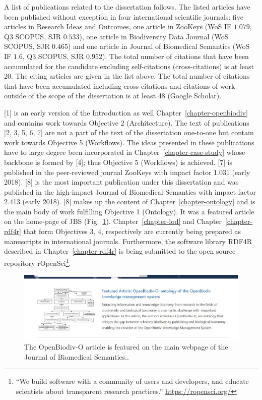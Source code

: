 A list of publications related to the dissertation follows. The listed articles have been published without exception in four international scientific journals: five articles in Research Ideas and Outcomes, one article in ZooKeys (WoS IF $1.079$, Q3 SCOPUS, SJR $0.533$), one article in Biodiversity Data Journal (WoS SCOPUS, SJR 0.465) and one article in Journal of Biomedical Semantics (WoS IF $1.6$, Q3 SCOPUS, SJR $0.952$). The total number of citations that have been accumulated for the candidate excluding self-citations (cross-citations) is at least 20. The citing articles are given in the list above. The total number of citations that have been accumulated including cross-citations and citations of work outside of the scope of the dissertation is at least 48 (Google Scholar).

[1] is an early version of the Introduction as well Chapter~\ref{chapter-openbiodiv} and contains work towards Objective 2 (Architecture). The text of publications [2, 3, 5, 6, 7] are not a part of the text of the dissertation one-to-one but contain work towards Objective 5 (Workflows). The ideas presented in these publications have to large degree been incorporated in Chapter~\ref{chapter-case-study} whose backbone is formed by [4]; thus Objective 5 (Workflows) is achieved. [7] is published in the peer-reviewed journal ZooKeys with impact factor 1.031 (early 2018). [8] is the most important publication under this dissertation and was published in the high-impact Journal of Biomedical Semantics with impact factor 2.413 (early 2018). [8] makes up the content of Chapter~\ref{chapter-ontology} and is the main body of work fulfilling Objective 1 (Ontology). It was a featured article on the home-page of JBS (Fig.~\ref{fig:jbs-featured}). Chapter~\ref{chapter-lod} and Chapter~\ref{chapter-rdf4r} that form Objectives 3, 4, respectively are currently being prepared as manuscripts in international journals. Furthermore, the software library RDF4R described in Chapter~\ref{chapter-rdf4r} is being submitted to the open source repository rOpenSci\footnote{``We build software with a community of users and developers, and educate scientists about transparent research practices.'' \url{https://ropensci.org/}}.

\begin{figure}
\centering
\includegraphics[width=\textwidth]{Figures/JBS-featured.jpg}
\decoRule
\caption{The OpenBiodiv-O article is featured on the main webpage of the Journal of Biomedical Semantics..}
\label{fig:jbs-featured}
\end{figure}

